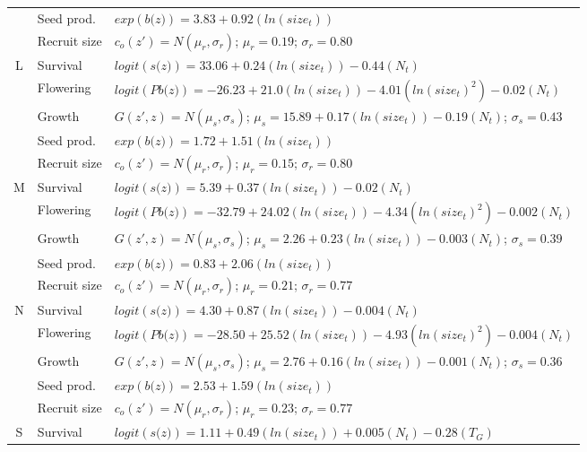 \documentclass[12pt, letterpaper]{article}
\begin{document}
\begin{spacing}{1.3}
\begin{longtable}[ht]{c|l|p{}}
         & Seed prod.  & $exp(\textit{b(z)}) = 3.83 + 0.92(ln(size_t))$  \\
         \rowcolor[gray]{.95}& Recruit size  &  $c_o(z') = N(\mu_r, \sigma_r)$; $\mu_r = 0.19$; $\sigma_r = 0.80$ \\
         \hline
         L  &  Survival  &  $logit(\textit{s(z)})= 33.06 + 0.24(ln(size_t)) -0.44(N_t)$ \\
         \rowcolor[gray]{.95}& Flowering  & $logit(\textit{Pb(z)})  = -26.23 + 21.0(ln(size_t)) -4.01(ln(size_t)^2) -0.02(N_t)$ \\
         & Growth  &  $G(z',z) = N(\mu_s, \sigma_s)$; $\mu_s = 15.89 + 0.17(ln(size_t)) -0.19(N_t)$; $\sigma_s = 0.43$\\
         \rowcolor[gray]{.95}& Seed prod.  & $exp(\textit{b(z)}) = 1.72 + 1.51(ln(size_t))$  \\
         & Recruit size  &  $c_o(z') = N(\mu_r, \sigma_r)$; $\mu_r = 0.15$; $\sigma_r = 0.80$ \\
         \hline
         \rowcolor[gray]{.95}M  &  Survival  &  $logit(\textit{s(z)})= 5.39 + 0.37(ln(size_t)) -0.02(N_t)$ \\
         & Flowering  & $logit(\textit{Pb(z)})  = -32.79 + 24.02(ln(size_t)) -4.34(ln(size_t)^2) -0.002(N_t)$ \\
         \rowcolor[gray]{.95}& Growth  &  $G(z',z) = N(\mu_s, \sigma_s)$; $\mu_s = 2.26 + 0.23(ln(size_t)) - 0.003(N_t)$; $\sigma_s = 0.39$\\
         & Seed prod.  & $exp(\textit{b(z)}) = 0.83 + 2.06(ln(size_t))$  \\
         \rowcolor[gray]{.95}& Recruit size  &  $c_o(z') = N(\mu_r, \sigma_r)$; $\mu_r = 0.21$; $\sigma_r = 0.77$ \\
         \hline
         N  &  Survival  &  $logit(\textit{s(z)})= 4.30 + 0.87(ln(size_t)) -0.004(N_t)$ \\
         \rowcolor[gray]{.95}& Flowering  & $logit(\textit{Pb(z)})  = -28.50 + 25.52(ln(size_t)) -4.93(ln(size_t)^2) -0.004(N_t)$ \\
         & Growth  &  $G(z',z) = N(\mu_s, \sigma_s)$; $\mu_s = 2.76 + 0.16(ln(size_t)) - 0.001(N_t)$; $\sigma_s = 0.36$\\
         \rowcolor[gray]{.95}& Seed prod.  & $exp(\textit{b(z)}) = 2.53 + 1.59(ln(size_t))$  \\
         & Recruit size  &  $c_o(z') = N(\mu_r, \sigma_r)$; $\mu_r = 0.23$; $\sigma_r = 0.77$ \\
         \hline
         \rowcolor[gray]{.95}S  &  Survival  &  $logit(\textit{s(z)})= 1.11 + 0.49(ln(size_t)) + 0.005(N_t) - 0.28 (T_G)$ \\

\end{longtable}
\end{spacing}
\end{document}

